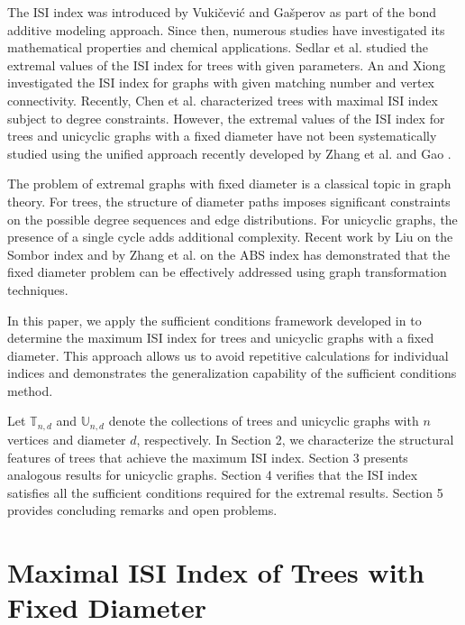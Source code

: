 \documentclass[12pt]{article}
\theoremstyle{definition}
\newcommand{\TT}{\mathbb{T}}
\newcommand{\UU}{\mathbb{U}}
\begin{document}
The ISI index was introduced by Vukičević and Gašperov \cite{vukicevic2010bond} as part of the bond additive modeling approach. Since then, numerous studies have investigated its mathematical properties and chemical applications. Sedlar et al. \cite{sedlar2015extremal} studied the extremal values of the ISI index for trees with given parameters. An and Xiong \cite{an2018extremal} investigated the ISI index for graphs with given matching number and vertex connectivity. Recently, Chen et al. \cite{chen2021inverse} characterized trees with maximal ISI index subject to degree constraints. However, the extremal values of the ISI index for trees and unicyclic graphs with a fixed diameter have not been systematically studied using the unified approach recently developed by Zhang et al. \cite{zhang2025abs} and Gao \cite{gao2025extremal}.

The problem of extremal graphs with fixed diameter is a classical topic in graph theory. For trees, the structure of diameter paths imposes significant constraints on the possible degree sequences and edge distributions. For unicyclic graphs, the presence of a single cycle adds additional complexity. Recent work by Liu \cite{liu2022sombor} on the Sombor index and by Zhang et al. \cite{zhang2025abs} on the ABS index has demonstrated that the fixed diameter problem can be effectively addressed using graph transformation techniques.

In this paper, we apply the sufficient conditions framework developed in \cite{zhang2025abs, gao2025extremal} to determine the maximum ISI index for trees and unicyclic graphs with a fixed diameter. This approach allows us to avoid repetitive calculations for individual indices and demonstrates the generalization capability of the sufficient conditions method.

Let \(\TT_{n,d}\) and \(\UU_{n,d}\) denote the collections of trees and unicyclic graphs with \(n\) vertices and diameter \(d\), respectively. In Section 2, we characterize the structural features of trees that achieve the maximum ISI index. Section 3 presents analogous results for unicyclic graphs. Section 4 verifies that the ISI index satisfies all the sufficient conditions required for the extremal results. Section 5 provides concluding remarks and open problems.

\section{Maximal ISI Index of Trees with Fixed Diameter}
\end{document}
